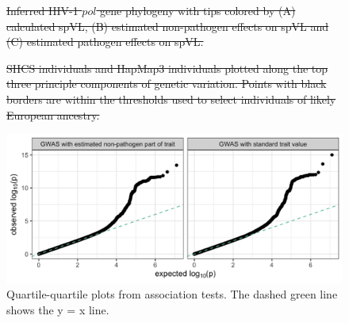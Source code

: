 \documentclass[11pt]{article} %
\providecommand{\DIFadd}[1]{{\protect\color{blue}\uwave{#1}}} %
\providecommand{\DIFdel}[1]{{\protect\color{red}\sout{#1}}}                      %
\providecommand{\DIFaddFL}[1]{\DIFadd{#1}} %
\providecommand{\DIFdelFL}[1]{\DIFdel{#1}} %
\providecommand{\DIFaddbeginFL}{} %
\providecommand{\DIFaddendFL}{} %
\providecommand{\DIFdelbeginFL}{} %
\providecommand{\DIFdelendFL}{} %
\newcommand{\DIFscaledelfig}{0.5}
\newlength{\DIFdelgraphicswidth} %
\newlength{\DIFdelgraphicsheight} %
\newcommand{\DIFaddincludegraphics}[2][]{{\color{blue}\fbox{\DIFOincludegraphics[#1]{#2}}}} %
\newcommand{\DIFdelincludegraphics}[2][]{%
\sbox{\DIFdelgraphicsbox}{\DIFOincludegraphics[#1]{#2}}%
\settoboxwidth{\DIFdelgraphicswidth}{\DIFdelgraphicsbox} %
\settoboxtotalheight{\DIFdelgraphicsheight}{\DIFdelgraphicsbox} %
\scalebox{\DIFscaledelfig}{%
\parbox[b]{\DIFdelgraphicswidth}{\usebox{\DIFdelgraphicsbox}\\[-\baselineskip] \rule{\DIFdelgraphicswidth}{0em}}\llap{\resizebox{\DIFdelgraphicswidth}{\DIFdelgraphicsheight}{%
\setlength{\unitlength}{\DIFdelgraphicswidth}%
\begin{picture}(1,1)%
\thicklines\linethickness{2pt} %
{\color[rgb]{1,0,0}\put(0,0){\framebox(1,1){}}}%
{\color[rgb]{1,0,0}\put(0,0){\line( 1,1){1}}}%
{\color[rgb]{1,0,0}\put(0,1){\line(1,-1){1}}}%
\end{picture}%
}\hspace*{3pt}}} %
} %
\DeclareRobustCommand{\DIFaddbeginFL}{\DIFOaddbeginFL \let\includegraphics\DIFaddincludegraphics} %
\DeclareRobustCommand{\DIFaddendFL}{\DIFOaddendFL \let\includegraphics\DIFOincludegraphics} %
\DeclareRobustCommand{\DIFdelbeginFL}{\DIFOdelbeginFL \let\includegraphics\DIFdelincludegraphics} %
\DeclareRobustCommand{\DIFdelendFL}{\DIFOaddendFL \let\includegraphics\DIFOincludegraphics} %
\begin{document}
\begin{doublespace}
\begin{figure}[H]
	\DIFdelbeginFL %
{%
\DIFdelFL{Inferred HIV-1 $pol$ gene phylogeny with tips colored by (A) calculated spVL, (B) estimated non-pathogen effects on spVL and (C) estimated pathogen effects on spVL.}}

\DIFdelFL{SHCS individuals and HapMap3 individuals plotted along the top three principle components of genetic variation. Points with black borders are within the thresholds used to select individuals of likely European ancestry.}%

\DIFdelendFL \centering
	\includegraphics[width=\linewidth]{figures/qq_plots.png}
	\caption{Quartile-quartile plots from \DIFaddbeginFL \DIFaddFL{HIV-1 spVL }\DIFaddendFL association tests. The dashed green line shows the y = x line.}
	\label{fig:qq-plots}
\end{figure}


\end{doublespace}
\end{document}
